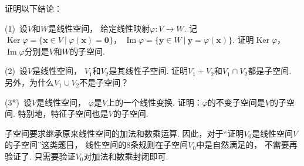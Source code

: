 \bigskip

\begin{example}
    证明以下结论：

    (1)~设$V$和$W$是线性空间，
    给定线性映射$\varphi: V \to W$.
    记$\operatorname{Ker} \varphi = \{ \bm{x} \in V ~|~ \varphi (\bm{x}) = \bm{0} \}$，
    $\operatorname{Im} \varphi = \{ \bm{y} \in W ~|~ \bm{y} = \varphi (\bm{x})\}$.
    证明$\operatorname{Ker}\varphi$，
    $\operatorname{Im} \varphi$分别是$V$和$W$的子空间.

    (2)~设$V$是线性空间，
    $V_1$和$V_2$是其线性子空间.
    证明$V_1 + V_2$和$V_1 \cap V_2$都是子空间.
    另外，为什么$V_1 \cup V_2$不是子空间？

    (3*)~设$V$是线性空间，
    $\varphi$是$V$上的一个线性变换.
    证明：$\varphi$的不变子空间是$V$的子空间.
    特别地，特征子空间也是$V$的子空间.
\end{example}
\smallskip
\begin{remark}
    子空间要求继承原来线性空间的加法和数乘运算.
    因此，对于“证明$V_0$是线性空间$V$的子空间”这类题目，
    线性空间的$8$条规则在子空间$V_0$中是自然满足的，
    不需要再验证了.
    只需要验证$V_0$对加法和数乘封闭即可.
\end{remark}
\smallskip
